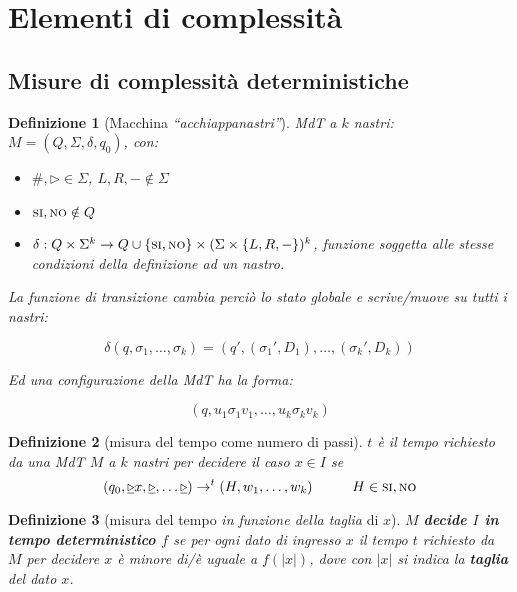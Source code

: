 \documentclass[a4paper,10pt,oneside]{article}
\theoremstyle{break}
\newtheorem{deff}{Definizione}[section]
\newcommand{\SI}{\textsc{si}}
\newcommand{\NO}{\textsc{no}}
\begin{document}
 
\section{Elementi di complessità}
\subsection{Misure di complessità deterministiche}

\begin{deff}[Macchina \emph{``acchiappanastri''}]
 MdT a $k$ nastri: $M = (Q, \Sigma, \delta, q_0)$, con:
 \begin{itemize}
  \item $\#, \triangleright \in \Sigma$, $L, R, - \notin \Sigma$
  \item $\SI, \NO \notin Q$
  \item $\delta : Q \times \Sigma^k \to Q \cup \{\SI, \NO\} \times (\Sigma \times\{L, R, -\})^k$, funzione soggetta alle stesse condizioni della definizione ad un nastro.
 \end{itemize}
 
 \begin{multicols}{2}
 La funzione di transizione cambia perciò lo stato globale e scrive/muove su tutti i nastri:
 
 \[ \delta (q, \sigma_1, \hdots, \sigma_k) = (q', (\sigma_1', D_1), \hdots , (\sigma_k', D_k)) \]

 Ed una configurazione della MdT ha la forma:
 
 \[ (q, u_1\sigma_1v_1, \hdots, u_k\sigma_kv_k) \]
 
 \end{multicols}

\end{deff}

\begin{deff} [misura del tempo come numero di passi]
 $t$ è il tempo richiesto da una MdT $M$ a $k$ nastri per decidere il caso $x \in I$ se 
 \[ (q_0, \underline \triangleright x, \underline \triangleright , \hdots \underline \triangleright ) \to^t (H, w_1, \hdots, w_k)\hspace{1cm} H \in {\SI, \NO} \]
\end{deff}

\begin{deff} [misura del tempo \textit{in funzione della taglia} di $x$]
$M$ \textbf{decide $I$ in tempo deterministico $f$} se per ogni dato
di ingresso $x$ il tempo $t$ richiesto da $M$ per decidere $x$ è minore di/è uguale a $f(|x|)$, dove con $|x|$ si indica la \textbf{taglia} del dato $x$.
\end{deff}
\end{document}
